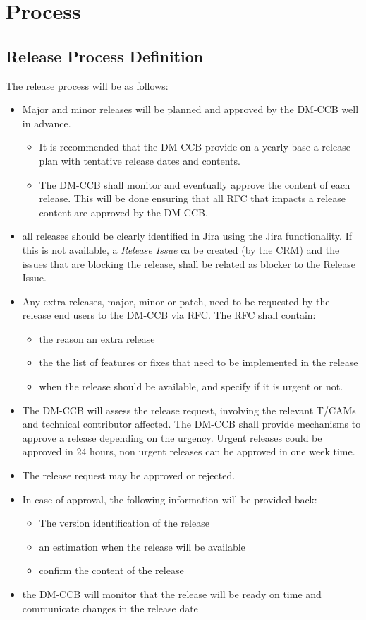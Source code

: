 \section{Process} \label{sec:process}

\subsection{Release Process Definition}

The release process will be as follows:

\begin{itemize}
\item Major and minor releases will be planned and approved by the DM-CCB well in advance. 
\begin{itemize}
  \item It is recommended that the DM-CCB provide on a yearly base a release plan with tentative release dates and contents.
  \item The DM-CCB shall monitor and eventually approve the content of each release. This will be done ensuring that all RFC that impacts a release content are approved by the DM-CCB.
\end{itemize}
\item all releases should be clearly identified in Jira using the Jira functionality. If this is not available, a {\it Release Issue} ca be created (by the CRM) and the issues that are blocking the release, shall be related as blocker to the Release Issue. 
\item Any extra releases, major, minor or patch, need to be requested by the release end users to the DM-CCB via RFC. The RFC shall contain:
\begin{itemize}
  \item the reason an extra release
  \item the the list of features or fixes that need to be implemented in the release
  \item when the release should be available, and specify if it is urgent or not.
\end{itemize}
\item The DM-CCB will assess the release request, involving the relevant T/CAMs and technical contributor affected. 
The DM-CCB shall provide mechanisms to approve a release depending on the urgency. 
Urgent releases could be approved in 24 hours, non urgent releases can be approved in one week time.
\item The release request may be approved or rejected.
\item In case of approval, the following information will be provided back:
\begin{itemize}
  \item The version identification of the release
  \item an estimation when the release will be available
  \item confirm the content of the release
\end{itemize}
\item the DM-CCB will monitor that the release will be ready on time and communicate changes in the release date
\end{itemize}


